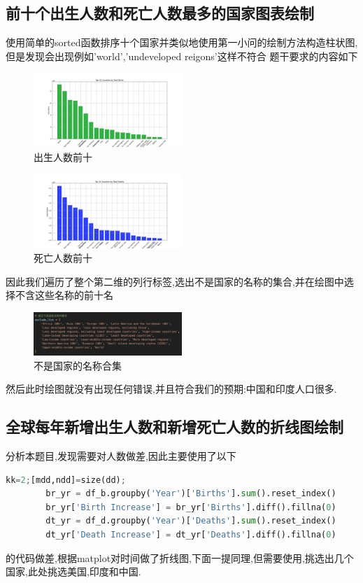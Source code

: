 \documentclass{ctexart}
\begin{document}
    \subsection{\textbf{前十个出生人数和死亡人数最多的国家图表绘制}}
    \noindent 使用简单的sorted函数排序十个国家并类似地使用第一小问的绘制方法构造柱状图,但是发现会出现例如'world','undeveloped reigons'这样不符合
    题干要求的内容如下
    \begin{figure}[h!]
        \centering
        \includegraphics[width=0.5\textwidth]{img/world_most_10_birth_in_year.png}
        \caption{出生人数前十}
        \label{1}
    \end{figure}

    \begin{figure}[h!]
        \centering
        \includegraphics[width=0.5\textwidth]{img/world_most_10_death_in_year.png}
        \caption{死亡人数前十}
        \label{2}
    \end{figure}
    
    \noindent 因此我们遍历了整个第二维的列行标签,选出不是国家的名称的集合,并在绘图中选择不含这些名称的前十名
    \begin{figure}[h!]
        \centering
        \includegraphics[width=0.5\textwidth]{img/excluded.png}
        \caption{不是国家的名称合集}
        \label{3}
    \end{figure}
    \noindent 然后此时绘图就没有出现任何错误,并且符合我们的预期:中国和印度人口很多.
    \subsection{\textbf{全球每年新增出生人数和新增死亡人数的折线图绘制}}
    \noindent 分析本题目,发现需要对人数做差,因此主要使用了以下
    \begin{lstlisting}[language=Python]
        kk=2;[mdd,ndd]=size(dd);
        br_yr = df_b.groupby('Year')['Births'].sum().reset_index()
        br_yr['Birth Increase'] = br_yr['Births'].diff().fillna(0)
        dt_yr = df_d.groupby('Year')['Deaths'].sum().reset_index()
        dt_yr['Death Increase'] = dt_yr['Deaths'].diff().fillna(0)
    \end{lstlisting}
    的代码做差,根据matplot对时间做了折线图,下面一提同理,但需要使用,挑选出几个国家,此处挑选美国,印度和中国.
\end{document}
